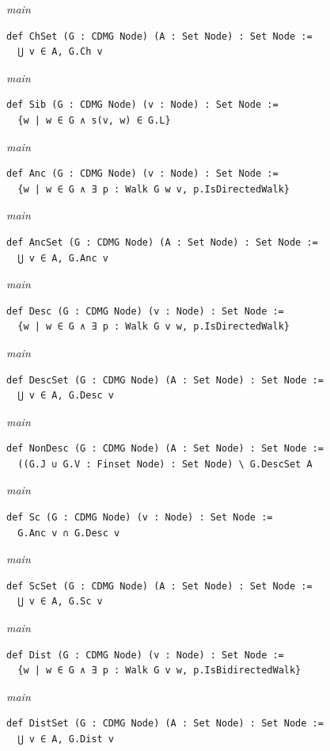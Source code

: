 {\small\textit{main}}
\begin{verbatim}
def ChSet (G : CDMG Node) (A : Set Node) : Set Node :=
  ⋃ v ∈ A, G.Ch v
\end{verbatim}
{\small\textit{main}}
\begin{verbatim}
def Sib (G : CDMG Node) (v : Node) : Set Node :=
  {w | w ∈ G ∧ s(v, w) ∈ G.L}
\end{verbatim}
{\small\textit{main}}
\begin{verbatim}
def Anc (G : CDMG Node) (v : Node) : Set Node :=
  {w | w ∈ G ∧ ∃ p : Walk G w v, p.IsDirectedWalk}
\end{verbatim}
{\small\textit{main}}
\begin{verbatim}
def AncSet (G : CDMG Node) (A : Set Node) : Set Node :=
  ⋃ v ∈ A, G.Anc v
\end{verbatim}
{\small\textit{main}}
\begin{verbatim}
def Desc (G : CDMG Node) (v : Node) : Set Node :=
  {w | w ∈ G ∧ ∃ p : Walk G v w, p.IsDirectedWalk}
\end{verbatim}
{\small\textit{main}}
\begin{verbatim}
def DescSet (G : CDMG Node) (A : Set Node) : Set Node :=
  ⋃ v ∈ A, G.Desc v
\end{verbatim}
{\small\textit{main}}
\begin{verbatim}
def NonDesc (G : CDMG Node) (A : Set Node) : Set Node :=
  ((G.J ∪ G.V : Finset Node) : Set Node) \ G.DescSet A
\end{verbatim}
{\small\textit{main}}
\begin{verbatim}
def Sc (G : CDMG Node) (v : Node) : Set Node :=
  G.Anc v ∩ G.Desc v
\end{verbatim}
{\small\textit{main}}
\begin{verbatim}
def ScSet (G : CDMG Node) (A : Set Node) : Set Node :=
  ⋃ v ∈ A, G.Sc v
\end{verbatim}
{\small\textit{main}}
\begin{verbatim}
def Dist (G : CDMG Node) (v : Node) : Set Node :=
  {w | w ∈ G ∧ ∃ p : Walk G v w, p.IsBidirectedWalk}
\end{verbatim}
{\small\textit{main}}
\begin{verbatim}
def DistSet (G : CDMG Node) (A : Set Node) : Set Node :=
  ⋃ v ∈ A, G.Dist v
\end{verbatim}
~%

